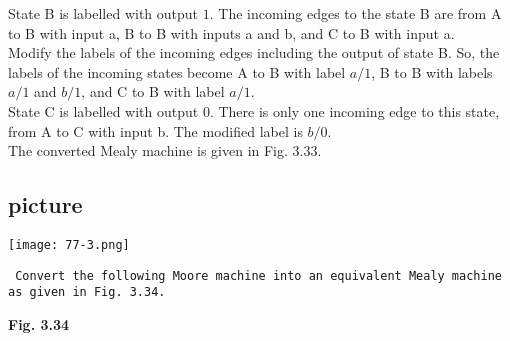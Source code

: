 \documentclass{article}
\begin{document}
 State B is labelled with output $1$. The incoming edges
to the state B are from A to B with input a, B to B with
inputs a and b, and C to B with input a.\\
\hspace*{0.2cm} Modify the labels of the incoming edges including
the output of state B. So, the labels of the incoming
states become A to B with label $a/1$, B to B with labels
$a/1$ and $b/1$, and C to B with label $a/1$.\\
 State C is labelled with output $0$. There is only one
incoming edge to this state, from A to C with input b.
The modified label is $b/0$.\\
\hspace*{0.2cm} The converted Mealy machine is given in Fig. 3.33.


\begin{center}
\section{picture}
\texttt{[image: 77-3.png]}
\end{center}

\hspace*{0.1cm} \texttt{ Convert the following Moore machine into an equivalent Mealy machine as given in
Fig. 3.34.}

\begin{center}
\end{center}
\begin{center}
\textbf{Fig. 3.34}
\end{center}
\end{document}
